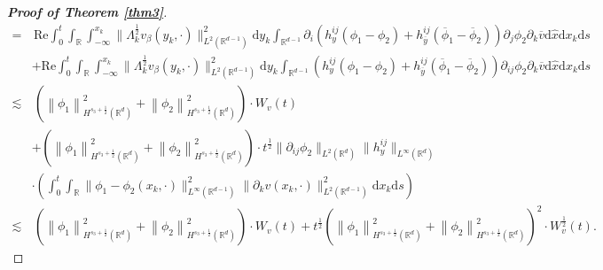 \documentclass[10pt,a4paper]{amsart}
\begin{document}
\begin{proof}[\textbf{Proof of Theorem \ref{thm3}}]
\begin{align}
	 	=&\,\mathrm{Re}  \int_0^t \int_{\mathbb{R}} \int_{-\infty}^{x_k} \|\Lambda_k^{\frac 12}v_{\beta}(y_k,\cdot)\|^2_{L^2(\mathbb{R}^{d-1})} \mathrm{d} y_k	\int_{\mathbb{R}^{d-1}} \partial_i\left( h^{ij}_y  \left(\phi_1 -  \phi_2 \right)+h^{ij}_{\overline{y}} (\overline{\phi}_1-\overline{\phi}_2)\right) \partial_j\phi_2\partial_k \overline{v}  \mathrm{d} \hat{x}  \mathrm{d} x_k \mathrm{d}s \nonumber\\
	 	&+ \mathrm{Re}\int_0^t \int_{\mathbb{R}}  \int_{-\infty}^{x_k} \|\Lambda_k^{\frac 12}v_{\beta}(y_k,\cdot)\|^2_{L^2(\mathbb{R}^{d-1})} \mathrm{d} y_k	\int_{\mathbb{R}^{d-1}}   \left( h^{ij}_y  \left(\phi_1 -  \phi_2 \right)+h^{ij}_{\overline{y}} (\overline{\phi}_1-\overline{\phi}_2)\right)\partial_{ij}\phi_2\partial_k \overline{v}   \mathrm{d} \hat{x}  \mathrm{d} x_k \mathrm{d}s\nonumber \\
	 	\lesssim &\,\left( \left\|  \phi_1\right\|_{H^{s_3+\frac 12}(\mathbb{R}^d)}^2 + \left\|  \phi_2\right\|_{H^{s_3+\frac 12}(\mathbb{R}^d)}^2 \right) \cdot W_v(t)\\
	 	&+ \left( \left\|  \phi_1\right\|_{H^{s_3+\frac 12}(\mathbb{R}^d)}^2 + \left\|  \phi_2\right\|_{H^{s_3+\frac 12}(\mathbb{R}^d)}^2 \right) \cdot t^{\frac 12}\| \partial_{ij}\phi_2\|_{L^2(\mathbb{R}^d)} \|h^{ij}_y\|_{L^{\infty}(\mathbb{R}^d)} \nonumber\\
	 	&\cdot\left(\int_0^t \int_{\mathbb{R}}    \|\phi_1 -  \phi_2 (x_k,\cdot)\|_{L^\infty(\mathbb{R}^{d-1})}^2   \|\partial_k v (x_k,\cdot)\|_{L^2(\mathbb{R}^{d-1})}^2 \mathrm{d} x_k \mathrm{d} s  \right)\nonumber\\
	 	\lesssim &\,\left( \left\|  \phi_1\right\|_{H^{s_3+\frac 12}(\mathbb{R}^d)}^2 + \left\|  \phi_2\right\|_{H^{s_3+\frac 12}(\mathbb{R}^d)}^2 \right) \cdot W_v(t)+t^{\frac 12}\left( \left\|  \phi_1\right\|_{H^{s_3+\frac 12}(\mathbb{R}^d)}^2 + \left\|  \phi_2\right\|_{H^{s_3+\frac 12}(\mathbb{R}^d)}^2 \right)^2 \cdot W_v^{\frac 12}(t).\nonumber
	 \end{align}		
\end{proof}	
\end{document}
